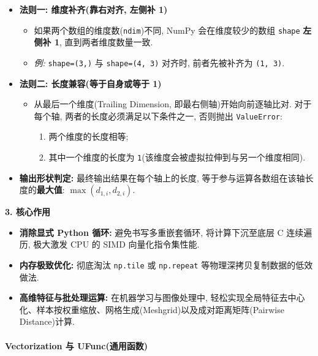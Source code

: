 \documentclass[11pt]{article}
\providecommand{\tightlist}{%
      \setlength{\itemsep}{0pt}\setlength{\parskip}{0pt}}
\begin{document}
\begin{itemize}
\tightlist
\item
  \textbf{法则一: 维度补齐(靠右对齐, 左侧补 1)}

  \begin{itemize}
  \tightlist
  \item
    如果两个数组的维度数(\texttt{ndim})不同, NumPy 会在维度较少的数组
    \texttt{shape} \textbf{左侧补 1}, 直到两者维度数量一致.
  \item
    \emph{例:} \texttt{shape=(3,)} 与 \texttt{shape=(4,\ 3)} 对齐时,
    前者先被补齐为 \texttt{(1,\ 3)}.
  \end{itemize}
\item
  \textbf{法则二: 长度兼容(等于自身或等于 1)}

  \begin{itemize}
  \tightlist
  \item
    从最后一个维度(Trailing Dimension, 即最右侧轴)开始向前逐轴比对.
    对于每个轴, 两者的长度必须满足以下条件之一, 否则抛出
    \texttt{ValueError}:

    \begin{enumerate}
    \def\labelenumi{\arabic{enumi}.}
    \tightlist
    \item
      两个维度的长度相等;
    \item
      其中一个维度的长度为
      \texttt{1}(该维度会被虚拟拉伸到与另一个维度相同).
    \end{enumerate}
  \end{itemize}
\item
  \textbf{输出形状判定:} 最终输出结果在每个轴上的长度,
  等于参与运算各数组在该轴长度的\textbf{最大值}:
  \(\max(d_{1,i}, d_{2,i})\).
\end{itemize}

\textbf{3. 核心作用}

\begin{itemize}
\tightlist
\item
  \textbf{消除显式 Python 循环:} 避免书写多重嵌套循环, 将计算下沉至底层
  C 连续遍历, 极大激发 CPU 的 SIMD 向量化指令集性能.
\item
  \textbf{内存极致优化:} 彻底淘汰 \texttt{np.tile} 或 \texttt{np.repeat}
  等物理深拷贝复制数据的低效做法.
\item
  \textbf{高维特征与批处理运算:} 在机器学习与图像处理中,
  轻松实现全局特征去中心化、样本按权重缩放、网格生成(Meshgrid)以及成对距离矩阵(Pairwise
  Distance)计算.
\end{itemize}

    \paragraph{Vectorization 与
UFunc(通用函数)}\label{vectorization-ux4e0e-ufuncux901aux7528ux51fdux6570}
\end{document}
